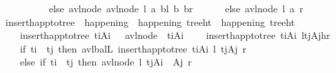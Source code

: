 \begin{isabellebody}
\ \ \ \ \ \ \ \ \ \ else\ avl{\isacharunderscore}{\kern0pt}node\ {\isacharparenleft}{\kern0pt}avl{\isacharunderscore}{\kern0pt}node\ l\ a\ bl{\isacharparenright}{\kern0pt}\ b\ br\isanewline
\ \ \ \ \ \ else\ avl{\isacharunderscore}{\kern0pt}node\ l\ a\ r{\isacharparenright}{\kern0pt}{\isachardoublequoteclose}\isanewline
\isanewline
\ \ \isamarkupfalse%
\ insert{\isacharunderscore}{\kern0pt}happ{\isacharunderscore}{\kern0pt}to{\isacharunderscore}{\kern0pt}tree\ {\isacharcolon}{\kern0pt}{\isacharcolon}{\kern0pt}\ {\isachardoublequoteopen}happening\ {\isasymRightarrow}\ happening\ tree{\isacharunderscore}{\kern0pt}ht\ {\isasymRightarrow}\ happening\ tree{\isacharunderscore}{\kern0pt}ht{\isachardoublequoteclose}\ \isanewline
\ \ \ \ {\isachardoublequoteopen}insert{\isacharunderscore}{\kern0pt}happ{\isacharunderscore}{\kern0pt}to{\isacharunderscore}{\kern0pt}tree\ {\isacharparenleft}{\kern0pt}t\isactrlsub i{\isacharcomma}{\kern0pt}A\isactrlsub i{\isacharparenright}{\kern0pt}\ {\isasymlangle}{\isasymrangle}\ {\isacharequal}{\kern0pt}\ avl{\isacharunderscore}{\kern0pt}node\ {\isasymlangle}{\isasymrangle}\ {\isacharparenleft}{\kern0pt}t\isactrlsub i{\isacharcomma}{\kern0pt}A\isactrlsub i{\isacharparenright}{\kern0pt}\ {\isasymlangle}{\isasymrangle}{\isachardoublequoteclose}\isanewline
\ \ {\isacharbar}{\kern0pt}\ {\isachardoublequoteopen}insert{\isacharunderscore}{\kern0pt}happ{\isacharunderscore}{\kern0pt}to{\isacharunderscore}{\kern0pt}tree\ {\isacharparenleft}{\kern0pt}t\isactrlsub i{\isacharcomma}{\kern0pt}A\isactrlsub i{\isacharparenright}{\kern0pt}\ {\isasymlangle}l{\isacharcomma}{\kern0pt}{\isacharparenleft}{\kern0pt}{\isacharparenleft}{\kern0pt}t\isactrlsub j{\isacharcomma}{\kern0pt}A\isactrlsub j{\isacharparenright}{\kern0pt}{\isacharcomma}{\kern0pt}h{\isacharparenright}{\kern0pt}{\isacharcomma}{\kern0pt}r{\isasymrangle}\ {\isacharequal}{\kern0pt}\ {\isacharparenleft}{\kern0pt}\isanewline
\ \ \ \ if\ t\isactrlsub i\ {\isacharless}{\kern0pt}\ t\isactrlsub j\ then\ avl{\isacharunderscore}{\kern0pt}balL\ {\isacharparenleft}{\kern0pt}insert{\isacharunderscore}{\kern0pt}happ{\isacharunderscore}{\kern0pt}to{\isacharunderscore}{\kern0pt}tree\ {\isacharparenleft}{\kern0pt}t\isactrlsub i{\isacharcomma}{\kern0pt}A\isactrlsub i{\isacharparenright}{\kern0pt}\ l{\isacharparenright}{\kern0pt}\ {\isacharparenleft}{\kern0pt}t\isactrlsub j{\isacharcomma}{\kern0pt}A\isactrlsub j{\isacharparenright}{\kern0pt}\ r\isanewline
\ \ \ \ else\ if\ t\isactrlsub i\ {\isacharequal}{\kern0pt}\ t\isactrlsub j\ then\ avl{\isacharunderscore}{\kern0pt}node\ l\ {\isacharparenleft}{\kern0pt}t\isactrlsub j{\isacharcomma}{\kern0pt}A\isactrlsub i\ {\isacharat}{\kern0pt}\ A\isactrlsub j{\isacharparenright}{\kern0pt}\ r\isanewline

\end{isabellebody}

